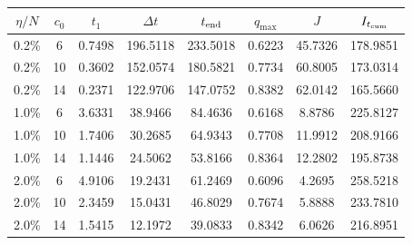\begin{tabular}{cccccccc}
\toprule
$\eta/N$ & $c_0$ & $t_1$ & $\Delta t$ & $t_{\rm end}$ & $q_{\max}$ & $J$ & $I_{t_{\rm cum}}$ \\
\midrule
0.2\% & 6 & 0.7498 & 196.5118 & 233.5018 & 0.6223 & 45.7326 & 178.9851 \\
0.2\% & 10 & 0.3602 & 152.0574 & 180.5821 & 0.7734 & 60.8005 & 173.0314 \\
0.2\% & 14 & 0.2371 & 122.9706 & 147.0752 & 0.8382 & 62.0142 & 165.5660 \\
1.0\% & 6 & 3.6331 & 38.9466 & 84.4636 & 0.6168 & 8.8786 & 225.8127 \\
1.0\% & 10 & 1.7406 & 30.2685 & 64.9343 & 0.7708 & 11.9912 & 208.9166 \\
1.0\% & 14 & 1.1446 & 24.5062 & 53.8166 & 0.8364 & 12.2802 & 195.8738 \\
2.0\% & 6 & 4.9106 & 19.2431 & 61.2469 & 0.6096 & 4.2695 & 258.5218 \\
2.0\% & 10 & 2.3459 & 15.0431 & 46.8029 & 0.7674 & 5.8888 & 233.7810 \\
2.0\% & 14 & 1.5415 & 12.1972 & 39.0833 & 0.8342 & 6.0626 & 216.8951 \\
\bottomrule
\end{tabular}
